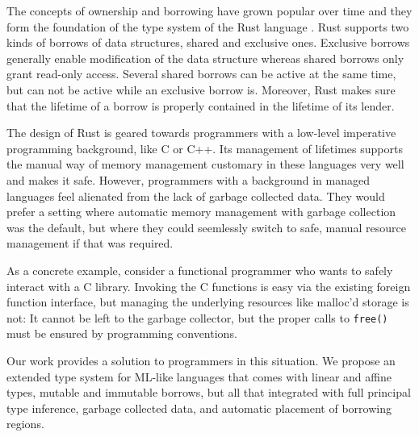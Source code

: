 The concepts of ownership and borrowing have grown popular over time
and they form the foundation of the type system of the Rust language
\cite{rust}. Rust supports two kinds of borrows of data structures, shared and
exclusive ones.
Exclusive borrows generally enable modification of the data structure
whereas shared borrows only grant read-only access.
Several shared borrows can be active at the same time, but
can not be active while an exclusive borrow is.
Moreover, Rust makes sure that the lifetime of a
borrow is properly contained in the lifetime of its lender. 

The design of Rust is geared towards programmers with a low-level
imperative programming background, like C or C++. Its management of
lifetimes supports the manual way of memory management customary in
these languages very well and makes it safe. However, programmers with
a background in managed languages feel alienated from the lack of garbage
collected data. They would prefer a setting where automatic memory
management with garbage collection was the default, but where they
could seemlessly switch to safe, manual resource management if that
was required.

As a concrete example, consider a functional programmer who wants to
safely interact with a C library. Invoking the C functions is easy via
the existing foreign function interface, but managing the underlying
resources like malloc'd storage is not: It cannot be left to the
garbage collector, but the proper calls to \texttt{free()} must be
ensured by programming conventions.

Our work provides a solution to programmers in this situation. We
propose an extended type system for ML-like languages that comes with
linear and affine types, mutable and immutable borrows, but all that
integrated with full principal type inference, garbage collected data, and
automatic placement of borrowing regions.

